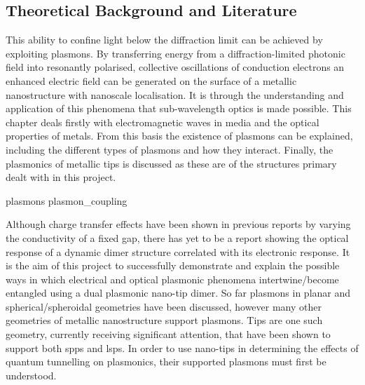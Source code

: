 \documentclass[12pt, a4paper, oneside]{book}
\begin{document}
\begin{singlespace}
{\color{white}
\chapter{Theoretical Background and Literature}}
\label{ch:theory}
\end{singlespace}


This ability to confine light below the diffraction limit can be achieved by exploiting plasmons. By transferring energy from a diffraction-limited photonic field into resonantly polarised, collective oscillations of conduction electrons an enhanced electric field can be generated on the surface of a metallic nanostructure with nanoscale localisation. It is through the understanding and application of this phenomena that sub-wavelength optics is made possible.
This chapter deals firstly with electromagnetic waves in media and the optical properties of metals. From this basis the existence of plasmons can be explained, including the different types of plasmons and how they interact. Finally, the plasmonics of metallic tips is discussed as these are of the structures primary dealt with in this project.

{plasmons}
{plasmon_coupling}

Although charge transfer effects have been shown in previous reports by varying the conductivity of a fixed gap, there has yet to be a report showing the optical response of a dynamic dimer structure correlated with its electronic response. It is the aim of this project to successfully demonstrate and explain the possible ways in which electrical and optical plasmonic phenomena {\color{red}intertwine/become entangled} using a dual plasmonic nano-tip dimer. So far plasmons in planar and {\color{red}spherical/spheroidal} geometries have been discussed, however many other geometries of metallic nanostructure support plasmons. Tips are one such geometry, currently receiving significant attention, that have been shown to support both \glspl{spp} and \glspl{lsp}. In order to use nano-tips in determining the effects of quantum tunnelling on plasmonics, their supported plasmons must first be understood.
\end{document}
